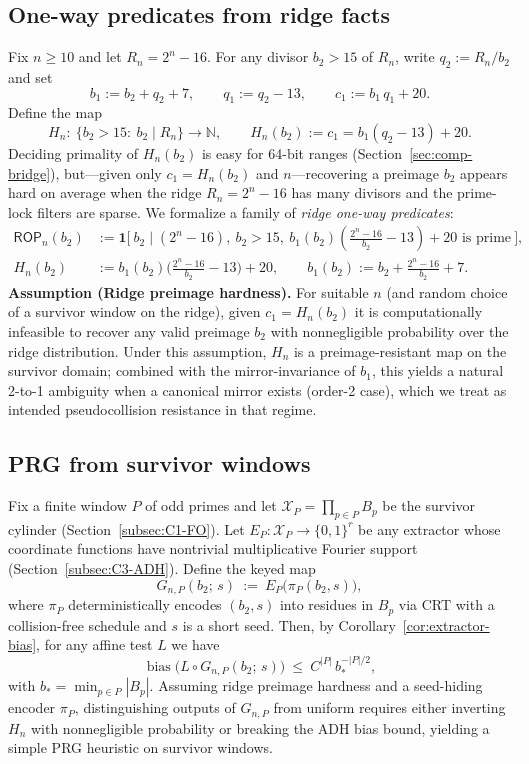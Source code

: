 \documentclass[12pt]{article}
\numberwithin{equation}{section}
\begin{document}
 \subsection{One-way predicates from ridge facts}
 Fix $n\ge 10$ and let $R_n=2^n-16$. For any divisor $b_2>15$ of $R_n$, write $q_2:=R_n/b_2$ and set
 \[
 b_1:=b_2+q_2+7,\qquad q_1:=q_2-13,\qquad c_1:=b_1\,q_1+20.
 \]
 Define the map
 \[
 H_n:\ \{b_2>15:\ b_2\mid R_n\}\longrightarrow \mathbb{N},\qquad H_n(b_2):=c_1=b_1(q_2-13)+20.
 \]
 Deciding primality of $H_n(b_2)$ is easy for 64-bit ranges (Section~\ref{sec:comp-bridge}), but—given only $c_1=H_n(b_2)$ and $n$—recovering a preimage $b_2$ appears hard on average when the ridge $R_n=2^n-16$ has many divisors and the prime-lock filters are sparse. We formalize a family of \emph{ridge one-way predicates}:
 \begin{align*}
   \mathsf{ROP}_n(b_2) &:= \mathbf{1}\big[\ b_2\mid (2^n-16),\ b_2>15,\ \text{$b_1(b_2)(\tfrac{2^n-16}{b_2}-13)+20$ is prime}\ \big],\\
   H_n(b_2) &:= b_1(b_2)\Big(\frac{2^n-16}{b_2}-13\Big)+20,\qquad b_1(b_2):=b_2+\frac{2^n-16}{b_2}+7.
 \end{align*}
 \noindent\textbf{Assumption (Ridge preimage hardness).} For suitable $n$ (and random choice of a survivor window on the ridge), given $c_1=H_n(b_2)$ it is computationally infeasible to recover any valid preimage $b_2$ with nonnegligible probability over the ridge distribution. Under this assumption, $H_n$ is a preimage-resistant map on the survivor domain; combined with the mirror-invariance of $b_1$, this yields a natural 2-to-1 ambiguity when a canonical mirror exists (order-2 case), which we treat as intended pseudocollision resistance in that regime.

\subsection{PRG from survivor windows}\label{subsec:prg}
Fix a finite window $P$ of odd primes and let $\mathscr{X}_P=\prod_{p\in P} B_p$ be the survivor cylinder (Section~\ref{subsec:C1-FO}). Let $E_P:\mathscr{X}_P\to\{0,1\}^r$ be any extractor whose coordinate functions have nontrivial multiplicative Fourier support (Section~\ref{subsec:C3-ADH}). Define the keyed map
\[
  G_{n,P}(b_2;\,s)\ :=\ E_P\!\big(\pi_P(b_2,s)\big),
\]
where $\pi_P$ deterministically encodes $(b_2,s)$ into residues in $B_p$ via CRT with a collision-free schedule and $s$ is a short seed. Then, by Corollary~\ref{cor:extractor-bias}, for any affine test $L$ we have
\[
  \operatorname{bias}\big(L\circ G_{n,P}(b_2;\,s)\big)\ \le\ C^{|P|}\, b_\ast^{-|P|/2},
\]
with $b_\ast=\min_{p\in P}|B_p|$. Assuming ridge preimage hardness and a seed-hiding encoder $\pi_P$, distinguishing outputs of $G_{n,P}$ from uniform requires either inverting $H_n$ with nonnegligible probability or breaking the ADH bias bound, yielding a simple PRG heuristic on survivor windows.
\end{document}
